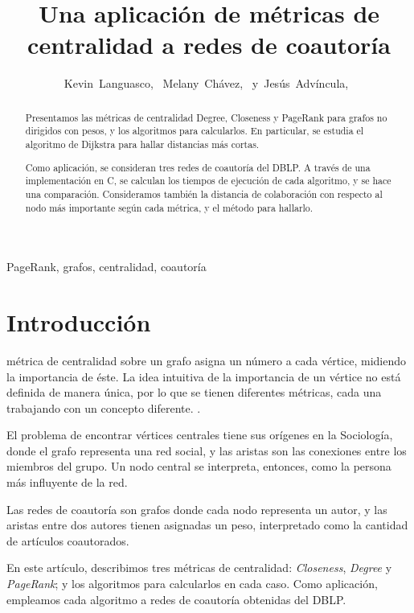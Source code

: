 \documentclass[journal]{IEEEtran}
\begin{document}
\title{Una aplicación de métricas de centralidad a redes de coautoría}
\author{Kevin~Languasco,~
        Melany~Chávez,~
        y~Jesús~Advíncula,~%
}

\maketitle
\begin{abstract}
Presentamos las métricas de centralidad Degree, Closeness y PageRank para grafos no dirigidos con pesos, y los algoritmos para calcularlos. En particular, se estudia el algoritmo de Dijkstra para hallar distancias más cortas.

Como aplicación, se consideran tres redes de coautoría del DBLP. A través de una implementación en C, se calculan los tiempos de ejecución de cada algoritmo, y se hace una comparación. Consideramos también la distancia de colaboración con respecto al nodo más importante según cada métrica, y el método para hallarlo.
\end{abstract}
\begin{IEEEkeywords}
PageRank, grafos, centralidad, coautoría
\end{IEEEkeywords}
\IEEEpeerreviewmaketitle

\section{Introducción}
 métrica de centralidad sobre un grafo asigna un número a cada vértice, midiendo la importancia de éste. La idea intuitiva de la importancia de un vértice no está definida de manera única, por lo que se tienen diferentes métricas, cada una trabajando con un concepto diferente. \cite{brandes}.

El problema de encontrar vértices centrales tiene sus orígenes en la Sociología, donde el grafo representa una red social, y las aristas son las conexiones entre los miembros del grupo. Un nodo central se interpreta, entonces, como la persona más influyente de la red.

Las redes de coautoría son grafos donde cada nodo representa un autor, y las aristas entre dos autores tienen asignadas un peso, interpretado como la cantidad de artículos coautorados.

En este artículo, describimos tres métricas de centralidad: \textit{Closeness}, \textit{Degree} y \textit{PageRank}; y los algoritmos para calcularlos en cada caso. Como aplicación, empleamos cada algoritmo a redes de coautoría obtenidas del DBLP.
\end{document}
